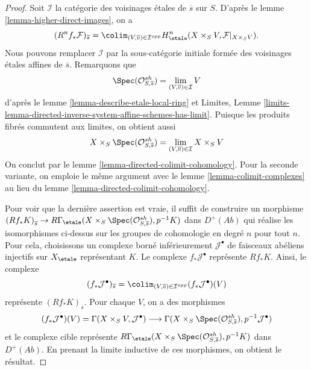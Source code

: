 \begin{proof}
Soit $\mathcal{I}$ la cat\'egorie des voisinages \'etales de $\overline{s}$
sur $S$. D'apr\`es le lemme \ref{lemma-higher-direct-images},
on a
$$
(R^nf_*\mathcal{F})_{\overline{s}} =
\colim_{(V, \overline{v}) \in \mathcal{I}^{opp}}
H_\etale^n(X \times_S V, \mathcal{F}|_{X \times_S V}).
$$
Nous pouvons remplacer $\mathcal{I}$ par la sous-cat\'egorie initiale form\'ee
des voisinages \'etales affines de $\overline{s}$. Remarquons que
$$
\Spec(\mathcal{O}_{S, \overline{s}}^{sh}) =
\lim_{(V, \overline{v}) \in \mathcal{I}} V
$$
d'apr\`es le lemme \ref{lemma-describe-etale-local-ring} et
Limites, Lemme
\ref{limits-lemma-directed-inverse-system-affine-schemes-has-limit}.
Puisque les produits fibr\'es commutent aux limites, on obtient aussi
$$
X \times_S \Spec(\mathcal{O}_{S, \overline{s}}^{sh}) =
\lim_{(V, \overline{v}) \in \mathcal{I}} X \times_S V
$$
On conclut par le lemme \ref{lemma-directed-colimit-cohomology}.
Pour la seconde variante, on emploie le m\^eme argument avec
le lemme \ref{lemma-colimit-complexes} au lieu du
lemme \ref{lemma-directed-colimit-cohomology}.

\medskip\noindent
Pour voir que la derni\`ere assertion est vraie, il suffit de construire un morphisme
$\left(Rf_*K\right)_{\overline{s}} \to
R\Gamma_\etale(X \times_S \Spec(\mathcal{O}_{S, \overline{s}}^{sh}), p^{-1}K)$
dans $D^+(\textit{Ab})$ qui r\'ealise les isomorphismes ci-dessus sur les groupes de cohomologie
en degr\'e $n$ pour tout $n$. Pour cela, choisissons un
complexe born\'e inf\'erieurement $\mathcal{J}^\bullet$ de faisceaux ab\'eliens injectifs
sur $X_\etale$ repr\'esentant $K$. Le complexe
$f_*\mathcal{J}^\bullet$ repr\'esente $Rf_*K$. Ainsi, le complexe
$$
(f_*\mathcal{J}^\bullet)_{\overline{s}} =
\colim_{(V, \overline{v}) \in \mathcal{I}^{opp}}
(f_*\mathcal{J}^\bullet)(V)
$$
repr\'esente $(Rf_*K)_{\overline{s}}$. Pour chaque $V$, on a des morphismes
$$
(f_*\mathcal{J}^\bullet)(V) =
\Gamma(X \times_S V, \mathcal{J}^\bullet)
\longrightarrow
\Gamma(X \times_S \Spec(\mathcal{O}_{S, \overline{s}}^{sh}),
p^{-1}\mathcal{J}^\bullet)
$$
et le complexe cible repr\'esente
$R\Gamma_\etale(X \times_S \Spec(\mathcal{O}_{S, \overline{s}}^{sh}), p^{-1}K)$
dans $D^+(\textit{Ab})$.
En prenant la limite inductive de ces morphismes, on obtient le r\'esultat.
\end{proof}


